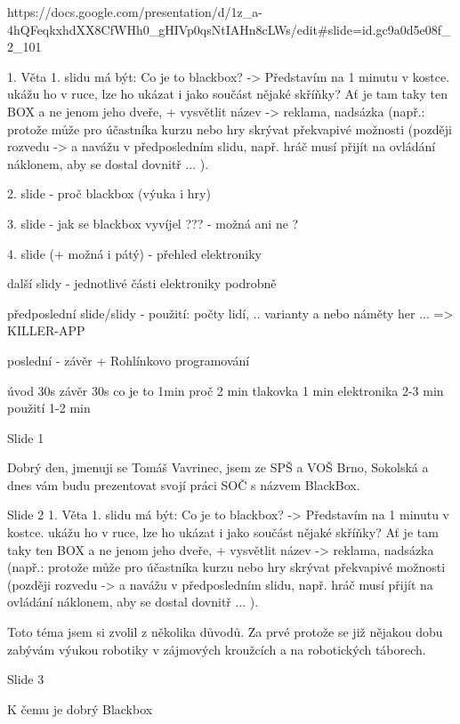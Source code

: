 https://docs.google.com/presentation/d/1z_a-4hQFeqkxhdXX8CfWHh0_gHIVp0qsNtIAHn8cLWs/edit#slide=id.gc9a0d5e08f_2_101

1. Věta 1. slidu má být: Co je to blackbox? -> Představím na 1 minutu v kostce.  
ukážu ho v ruce, lze ho ukázat i jako součást nějaké skříňky? Ať je tam taky ten BOX  
a ne jenom jeho dveře, 
+ vysvětlit název -> reklama, nadsázka (např.: protože může pro účastníka kurzu nebo 
hry skrývat překvapivé možnosti (později rozvedu -> a navážu v předposledním slidu, 
např. hráč musí přijít na ovládání náklonem, aby se dostal dovnitř ... ).


2. slide - proč blackbox (výuka i hry)

3. slide - jak se blackbox vyvíjel ??? - možná ani ne ? 

4. slide (+ možná i pátý) - přehled elektroniky 

další slidy - jednotlivé části elektroniky podrobně 


předposlední slide/slidy - použití: počty lidí, .. varianty a nebo náměty her ... => KILLER-APP

poslední - závěr + Rohlínkovo programování  

úvod 30s závěr 30s 
co je to 1min 
proč 2 min 
tlakovka 1 min 
elektronika 2-3 min 
použití 1-2 min 


Slide 1

Dobrý den, jmenuji se Tomáš Vavrinec, jsem ze SPŠ a VOŠ Brno, Sokolská
a dnes vám budu prezentovat svojí práci SOČ s názvem BlackBox.


Slide 2
1. Věta 1. slidu má být: Co je to blackbox? -> Představím na 1 minutu v kostce.  
ukážu ho v ruce, lze ho ukázat i jako součást nějaké skříňky? Ať je tam taky ten BOX  
a ne jenom jeho dveře, 
+ vysvětlit název -> reklama, nadsázka (např.: protože může pro účastníka kurzu nebo 
hry skrývat překvapivé možnosti (později rozvedu -> a navážu v předposledním slidu, 
např. hráč musí přijít na ovládání náklonem, aby se dostal dovnitř ... ).


Toto téma jsem si zvolil z několika důvodů. Za prvé protože se již nějakou dobu zabývám 
výukou robotiky v zájmových kroužcích a na robotických táborech. 

Slide 3 

K čemu je dobrý Blackbox 




